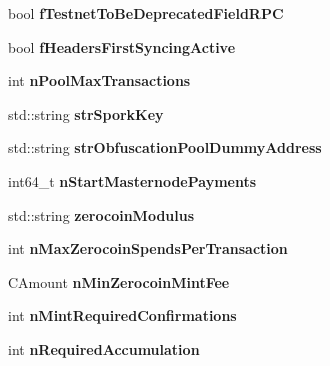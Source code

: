\begin{DoxyCompactItemize}
\item 
\mbox{\label{class_c_chain_params_a4f62f1b7070f83b48aa86564628a2e7d}} 
bool {\bfseries f\+Testnet\+To\+Be\+Deprecated\+Field\+R\+PC}
\item 
\mbox{\label{class_c_chain_params_af9f11f9732810c7773747b2746be299c}} 
bool {\bfseries f\+Headers\+First\+Syncing\+Active}
\item 
\mbox{\label{class_c_chain_params_addb1962eb12784aaea932fd49b5fd40b}} 
int {\bfseries n\+Pool\+Max\+Transactions}
\item 
\mbox{\label{class_c_chain_params_a58ca704d8cc6f625f8757487cccb6250}} 
std\+::string {\bfseries str\+Spork\+Key}
\item 
\mbox{\label{class_c_chain_params_a652c1db947c78ef3c6a1e7f599d33525}} 
std\+::string {\bfseries str\+Obfuscation\+Pool\+Dummy\+Address}
\item 
\mbox{\label{class_c_chain_params_a80fe48978b6626fdbc50b314a030511b}} 
int64\+\_\+t {\bfseries n\+Start\+Masternode\+Payments}
\item 
\mbox{\label{class_c_chain_params_adf6118d28adb3e4284323ddaf8d88bdb}} 
std\+::string {\bfseries zerocoin\+Modulus}
\item 
\mbox{\label{class_c_chain_params_a4cde3d26a9cdd7bbf40c01322a65b19f}} 
int {\bfseries n\+Max\+Zerocoin\+Spends\+Per\+Transaction}
\item 
\mbox{\label{class_c_chain_params_ae272352816d1a4bcaca51d9ff38ee9c9}} 
C\+Amount {\bfseries n\+Min\+Zerocoin\+Mint\+Fee}
\item 
\mbox{\label{class_c_chain_params_a1d5815ad4550d75b90e7b1aed21ed324}} 
int {\bfseries n\+Mint\+Required\+Confirmations}
\item 
\mbox{\label{class_c_chain_params_ab2f6ee6ffdd7f14ef7e5a2fb40276f53}} 
int {\bfseries n\+Required\+Accumulation}

\end{DoxyCompactItemize}
